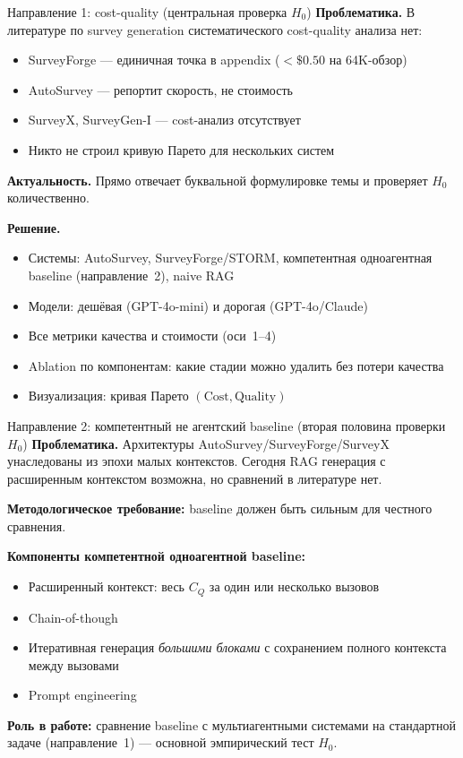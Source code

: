 \documentclass[10pt,aspectratio=169]{beamer}
\begin{document}
\begin{frame}{Направление 1: cost-quality (центральная проверка $H_0$)}
  \textbf{Проблематика.} В литературе по survey generation систематического cost-quality анализа нет:
  \begin{itemize}
    \item SurveyForge --- единичная точка в appendix ($< \$0.50$ на 64K-обзор)
    \item AutoSurvey --- репортит скорость, не стоимость
    \item SurveyX, SurveyGen-I --- cost-анализ отсутствует
    \item Никто не строил кривую Парето для нескольких систем
  \end{itemize}

  \vspace{0.3cm}
  \textbf{Актуальность.} Прямо отвечает буквальной формулировке темы и проверяет $H_0$ количественно.

  \vspace{0.3cm}
  \textbf{Решение.}
  \begin{itemize}
    \item Системы: AutoSurvey, SurveyForge/STORM, компетентная одноагентная baseline (направление~2), naive RAG
    \item Модели: дешёвая (GPT-4o-mini) и дорогая (GPT-4o/Claude)
    \item Все метрики качества и стоимости (оси~1--4)
    \item Ablation по компонентам: какие стадии можно удалить без потери качества
    \item Визуализация: кривая Парето $(\text{Cost}, \text{Quality})$
  \end{itemize}
\end{frame}

\begin{frame}{Направление 2: компетентный не агентский baseline (вторая половина проверки $H_0$)}
  \textbf{Проблематика.} Архитектуры AutoSurvey/SurveyForge/SurveyX унаследованы из эпохи малых контекстов. Сегодня RAG генерация с расширенным контекстом возможна, но сравнений в литературе нет.

  \vspace{0.3cm}
  \textbf{Методологическое требование:} baseline должен быть сильным для честного сравнения.

  \vspace{0.3cm}
  \textbf{Компоненты компетентной одноагентной baseline:}
  \begin{itemize}
    \item Расширенный контекст: весь $C_Q$ за один или несколько вызовов
    \item Chain-of-though
    \item Итеративная генерация \emph{большими блоками} с сохранением полного контекста между вызовами
    \item Prompt engineering
  \end{itemize}

  \vspace{0.3cm}
  \textbf{Роль в работе:} сравнение baseline с мультиагентными системами на стандартной задаче (направление~1) --- основной эмпирический тест $H_0$.
\end{frame}
\end{document}
